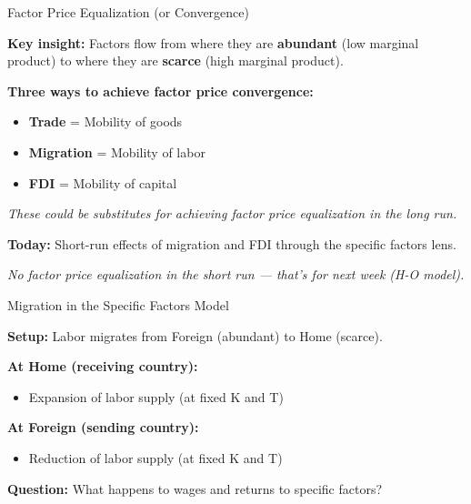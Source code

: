 \documentclass{beamer}
\begin{document}

\begin{frame}{Factor Price Equalization (or Convergence)}

\textbf{Key insight:} Factors flow from where they are \textbf{abundant} (low marginal product) to where they are \textbf{scarce} (high marginal product).

\vspace{0.5cm}

\textbf{Three ways to achieve factor price convergence:}
\begin{itemize}
    \item \textbf{Trade} = Mobility of goods
    \item \textbf{Migration} = Mobility of labor
    \item \textbf{FDI} = Mobility of capital
\end{itemize}

\vspace{0.3cm}

\textit{These could be substitutes for achieving factor price equalization in the long run.}

\vspace{0.5cm}

\textbf{Today:} Short-run effects of migration and FDI through the specific factors lens.

\vspace{0.2cm}

\textit{No factor price equalization in the short run --- that's for next week (H-O model).}

\end{frame}


\begin{frame}{Migration in the Specific Factors Model}

\textbf{Setup:} Labor migrates from Foreign (abundant) to Home (scarce).

\vspace{0.3cm}

\textbf{At Home (receiving country):}
\begin{itemize}
    \item Expansion of labor supply (at fixed K and T)
\end{itemize}

\textbf{At Foreign (sending country):}
\begin{itemize}
    \item Reduction of labor supply (at fixed K and T)
\end{itemize}

\vspace{0.3cm}

\textbf{Question:} What happens to wages and returns to specific factors?

\end{frame}
\end{document}

